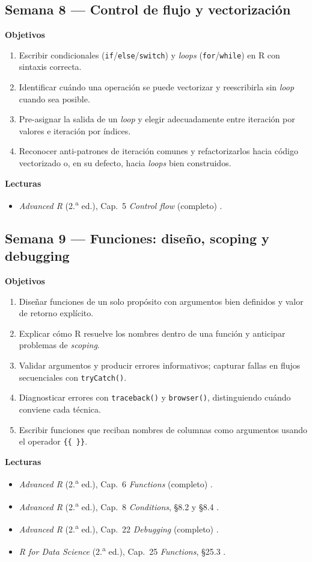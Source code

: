 \documentclass[11pt,letterpaper]{article}
\newcommand{\semanaSucinta}[2]{%
  \subsection*{\color{main}Semana #1 --- #2}%
}
\begin{document}
\semanaSucinta{8}{Control de flujo y vectorización}

\noindent\textbf{Objetivos}
\begin{enumerate}[leftmargin=*, itemsep=1pt]
    \item Escribir condicionales (\texttt{if}/\texttt{else}/\texttt{switch}) y \textit{loops} (\texttt{for}/\texttt{while}) en R con sintaxis correcta.
    \item Identificar cuándo una operación se puede vectorizar y reescribirla sin \textit{loop} cuando sea posible.
    \item Pre-asignar la salida de un \textit{loop} y elegir adecuadamente entre iteración por valores e iteración por índices.
    \item Reconocer anti-patrones de iteración comunes y refactorizarlos hacia código vectorizado o, en su defecto, hacia \textit{loops} bien construidos.
\end{enumerate}

\noindent\textbf{Lecturas}
\begin{itemize}[leftmargin=*, itemsep=1pt]
    \item \textit{Advanced R} (2.\textsuperscript{a} ed.), Cap.\ 5 \textit{Control flow} (completo) \cite{wickham2019advr}.
\end{itemize}

\semanaSucinta{9}{Funciones: diseño, scoping y debugging}

\noindent\textbf{Objetivos}
\begin{enumerate}[leftmargin=*, itemsep=1pt]
    \item Diseñar funciones de un solo propósito con argumentos bien definidos y valor de retorno explícito.
    \item Explicar cómo R resuelve los nombres dentro de una función y anticipar problemas de \textit{scoping}.
    \item Validar argumentos y producir errores informativos; capturar fallas en flujos secuenciales con \texttt{tryCatch()}.
    \item Diagnosticar errores con \texttt{traceback()} y \texttt{browser()}, distinguiendo cuándo conviene cada técnica.
    \item Escribir funciones que reciban nombres de columnas como argumentos usando el operador \texttt{\{\{~\}\}}.
\end{enumerate}

\noindent\textbf{Lecturas}
\begin{itemize}[leftmargin=*, itemsep=1pt]
    \item \textit{Advanced R} (2.\textsuperscript{a} ed.), Cap.\ 6 \textit{Functions} (completo) \cite{wickham2019advr}.
    \item \textit{Advanced R} (2.\textsuperscript{a} ed.), Cap.\ 8 \textit{Conditions}, §8.2 y §8.4 \cite{wickham2019advr}.
    \item \textit{Advanced R} (2.\textsuperscript{a} ed.), Cap.\ 22 \textit{Debugging} (completo) \cite{wickham2019advr}.
    \item \textit{R for Data Science} (2.\textsuperscript{a} ed.), Cap.\ 25 \textit{Functions}, §25.3 \cite{wickham2023r4ds}.
\end{itemize}
\end{document}
